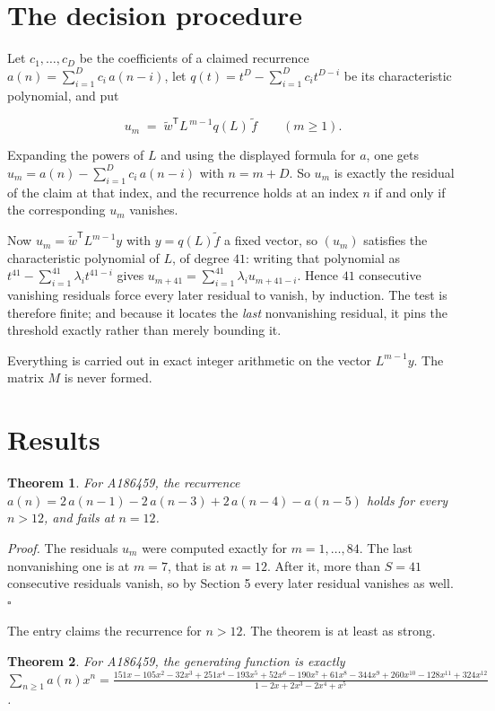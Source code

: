 \documentclass[11pt]{article}
\newtheorem{theorem}{Theorem}
\theoremstyle{definition}
\begin{document}
\section{The decision procedure}

Let $c_1,\dots,c_D$ be the coefficients of a claimed recurrence $a(n) = \sum_{i=1}^{D} c_i\,a(n-i)$, let $q(t) = t^{D} - \sum_{i=1}^{D} c_i t^{D-i}$ be its characteristic polynomial, and put

\[u_m \;=\; \tilde w^{\mathsf T} L^{\,m-1} q(L)\,\tilde f \qquad (m \ge 1).\]

Expanding the powers of $L$ and using the displayed formula for $a$, one gets $u_m = a(n) - \sum_{i=1}^{D} c_i\,a(n-i)$ with $n = m + D$. So $u_m$ is exactly the residual of the claim at that index, and the recurrence holds at an index $n$ if and only if the corresponding $u_m$ vanishes.

Now $u_m = \tilde w^{\mathsf T} L^{m-1} y$ with $y = q(L)\tilde f$ a fixed vector, so $(u_m)$ satisfies the characteristic polynomial of $L$, of degree $41$: writing that polynomial as $t^{41} - \sum_{i=1}^{41} \lambda_i t^{41-i}$ gives $u_{m+41} = \sum_{i=1}^{41} \lambda_i u_{m+41-i}$. Hence $41$ consecutive vanishing residuals force every later residual to vanish, by induction. The test is therefore finite; and because it locates the {\itshape last} nonvanishing residual, it pins the threshold exactly rather than merely bounding it.

Everything is carried out in exact integer arithmetic on the vector $L^{m-1}y$. The matrix $M$ is never formed.

\section{Results}

\begin{theorem} For A186459, the recurrence $a(n) = 2\,a(n-1) - 2\,a(n-3) + 2\,a(n-4) - a(n-5)$ holds for every $n > 12$, and fails at $n = 12$.\end{theorem}

{\itshape Proof.} The residuals $u_m$ were computed exactly for $m = 1,\dots,84$. The last nonvanishing one is at $m = 7$, that is at $n = 12$. After it, more than $S = 41$ consecutive residuals vanish, so by Section 5 every later residual vanishes as well. $\square$

The entry claims the recurrence for $n > 12$. The theorem is at least as strong.

\begin{theorem} For A186459, the generating function is exactly $\sum_{n\ge 1} a(n)x^n = \frac{151x - 105x^{2} - 32x^{3} + 251x^{4} - 193x^{5} + 52x^{6} - 190x^{7} + 61x^{8} - 344x^{9} + 260x^{10} - 128x^{11} + 324x^{12}}{1 - 2x + 2x^{3} - 2x^{4} + x^{5}}$.\end{theorem}
\end{document}
